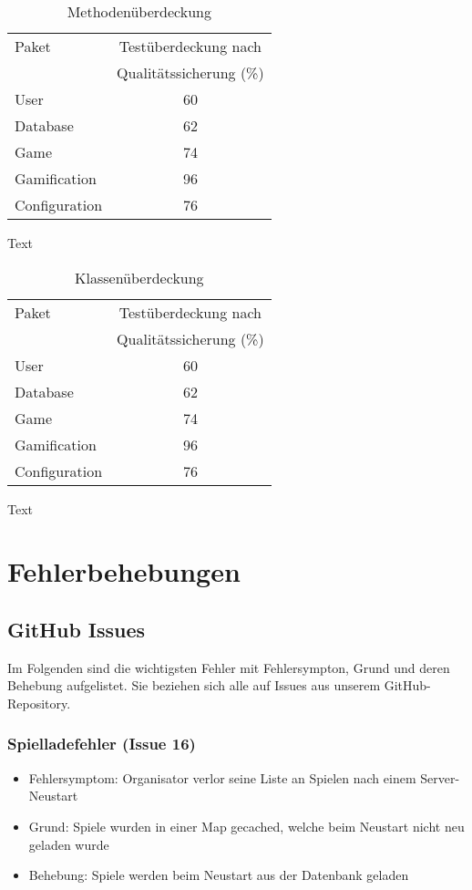 \documentclass[a4paper]{scrreprt}
\begin{document}
    \begin{table}[h]
        \centering
        \begin{tabular}{ | l | c | }
            \hline
            Paket & Testüberdeckung nach \\
            & Qualitätssicherung (\%) \\ \hline
            User & 60 \\
            Database & 62 \\
            Game & 74 \\
            Gamification & 96 \\
            Configuration & 76  \\
            \hline
        \end{tabular}
        \caption{Methodenüberdeckung}
    \end{table}%

    Text

    \begin{table}[h]
        \centering
        \begin{tabular}{ | l | c | }
            \hline
            Paket & Testüberdeckung nach \\
            & Qualitätssicherung (\%) \\ \hline
            User & 60 \\
            Database & 62 \\
            Game & 74 \\
            Gamification & 96 \\
            Configuration & 76  \\
            \hline
        \end{tabular}
        \caption{Klassenüberdeckung}
    \end{table}%

    Text


    \chapter{Fehlerbehebungen}

    \section{GitHub Issues}
    Im Folgenden sind die wichtigsten Fehler mit Fehlersympton, Grund und deren Behebung aufgelistet. Sie beziehen sich alle auf Issues
    aus unserem GitHub-Repository.

    \subsection{Spielladefehler (Issue 16)}
    \begin{itemize}
        \item Fehlersymptom: Organisator verlor seine Liste an Spielen nach einem Server-Neustart
        \item Grund: Spiele wurden in einer Map gecached, welche beim Neustart nicht neu geladen wurde
        \item Behebung: Spiele werden beim Neustart aus der Datenbank geladen
    \end{itemize}
\end{document}
